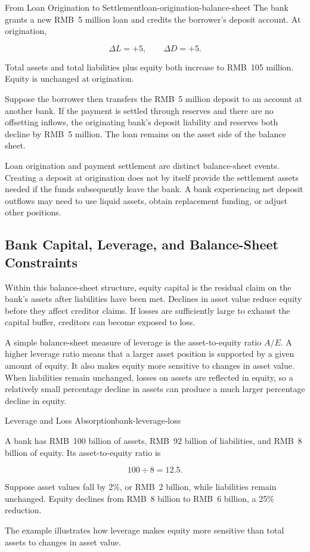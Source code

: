 \begin{example}{From Loan Origination to Settlement}{loan-origination-balance-sheet}
The bank grants a new RMB~5 million loan and credits the borrower's deposit account. At origination,

\[
\Delta L=+5,
\qquad
\Delta D=+5.
\]

Total assets and total liabilities plus equity both increase to RMB~105 million. Equity is unchanged at origination.

Suppose the borrower then transfers the RMB~5 million deposit to an account at another bank. If the payment is settled through reserves and there are no offsetting inflows, the originating bank's deposit liability and reserves both decline by RMB~5 million. The loan remains on the asset side of the balance sheet.

\end{example}

Loan origination and payment settlement are distinct balance-sheet events. Creating a deposit at origination does not by itself provide the settlement assets needed if the funds subsequently leave the bank. A bank experiencing net deposit outflows may need to use liquid assets, obtain replacement funding, or adjust other positions.

\subsection{Bank Capital, Leverage, and Balance-Sheet Constraints}

Within this balance-sheet structure, equity capital is the residual claim on the bank's assets after liabilities have been met. Declines in asset value reduce equity before they affect creditor claims. If losses are sufficiently large to exhaust the capital buffer, creditors can become exposed to loss.

A simple balance-sheet measure of leverage is the asset-to-equity ratio $A/E$. A higher leverage ratio means that a larger asset position is supported by a given amount of equity. It also makes equity more sensitive to changes in asset value. When liabilities remain unchanged, losses on assets are reflected in equity, so a relatively small percentage decline in assets can produce a much larger percentage decline in equity.

\begin{example}{Leverage and Loss Absorption}{bank-leverage-loss}

A bank has RMB~100 billion of assets, RMB~92 billion of liabilities, and RMB~8 billion of equity. Its asset-to-equity ratio is

\[
100\div 8=12.5.
\]

Suppose asset values fall by 2\%, or RMB~2 billion, while liabilities remain unchanged. Equity declines from RMB~8 billion to RMB~6 billion, a 25\% reduction.

The example illustrates how leverage makes equity more sensitive than total assets to changes in asset value.

\end{example}


